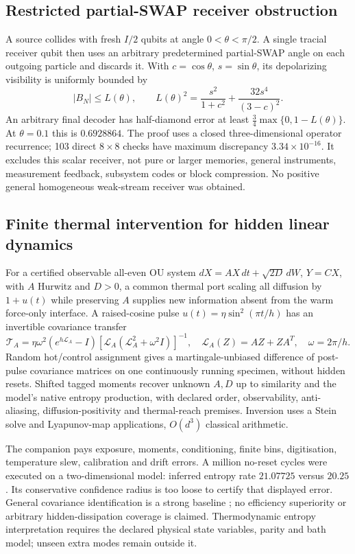 \documentclass[11pt]{article}
\begin{document}
\subsection{Restricted partial-SWAP receiver obstruction}
A source collides with fresh $I/2$ qubits at angle $0<\theta<\pi/2$. A single tracial
receiver qubit then uses an arbitrary predetermined partial-SWAP angle on each
outgoing particle and discards it. With $c=\cos\theta$, $s=\sin\theta$, its
depolarizing visibility is uniformly bounded by
\begin{equation}
 |B_N|\le L(\theta),\qquad
 L(\theta)^2=\frac{s^2}{1+c^2}+\frac{32s^4}{(3-c)^2}.
\end{equation}
An arbitrary final decoder has half-diamond error at least
$\tfrac34\max\{0,1-L(\theta)\}$. At $\theta=0.1$ this is $0.6928864$.
The proof uses a closed three-dimensional operator recurrence; 103 direct
$8\times8$ checks have maximum discrepancy $3.34\times10^{-16}$. It excludes
this scalar receiver, not pure or larger memories, general instruments,
measurement feedback, subsystem codes or block compression. No positive
general homogeneous weak-stream receiver was obtained.

\subsection{Finite thermal intervention for hidden linear dynamics}
For a certified observable all-even OU system
$dX=AX\,dt+\sqrt{2D}\,dW$, $Y=CX$, with $A$ Hurwitz and $D>0$, a common
thermal port scaling all diffusion by $1+u(t)$ while preserving $A$ supplies
new information absent from the warm force-only interface. A raised-cosine
pulse $u(t)=\eta\sin^2(\pi t/h)$ has an invertible covariance transfer
\begin{equation}
 \mathcal T_A=\eta\omega^2(e^{h\mathcal L_A}-I)
 [\mathcal L_A(\mathcal L_A^2+\omega^2 I)]^{-1},\quad
 \mathcal L_A(Z)=AZ+ZA^T,\quad\omega=2\pi/h.
\end{equation}
Random hot/control assignment gives a martingale-unbiased difference of
post-pulse covariance matrices on one continuously running specimen, without
hidden resets. Shifted tagged moments recover unknown $A,D$ up to similarity
and the model's native entropy production, with declared order, observability,
anti-aliasing, diffusion-positivity and thermal-reach premises. Inversion uses
a Stein solve and Lyapunov-map applications, $O(d^3)$ classical arithmetic.

The companion pays exposure, moments, conditioning, finite bins, digitisation,
temperature slew, calibration and drift errors. A million no-reset cycles were
executed on a two-dimensional model: inferred entropy rate $21.07725$ versus
$20.25$. Its conservative confidence radius is too loose to certify that
displayed error. General covariance identification is a strong baseline
\cite{kost}; no efficiency superiority or arbitrary hidden-dissipation coverage
is claimed. Thermodynamic entropy interpretation requires the declared physical
state variables, parity and bath model; unseen extra modes remain outside it.
\end{document}
